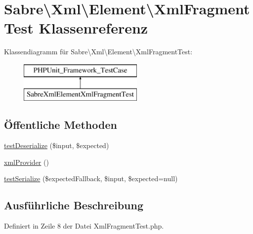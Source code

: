\hypertarget{class_sabre_1_1_xml_1_1_element_1_1_xml_fragment_test}{}\section{Sabre\textbackslash{}Xml\textbackslash{}Element\textbackslash{}Xml\+Fragment\+Test Klassenreferenz}
\label{class_sabre_1_1_xml_1_1_element_1_1_xml_fragment_test}
Klassendiagramm für Sabre\textbackslash{}Xml\textbackslash{}Element\textbackslash{}Xml\+Fragment\+Test\+:\begin{figure}[H]
\begin{center}
\leavevmode
\includegraphics[height=2.000000cm]{class_sabre_1_1_xml_1_1_element_1_1_xml_fragment_test}
\end{center}
\end{figure}
\subsection*{Öffentliche Methoden}
\begin{DoxyCompactItemize}
\item 
\mbox{\hyperlink{class_sabre_1_1_xml_1_1_element_1_1_xml_fragment_test_a6ca44021072236d4c691b8068839e6fc}{test\+Deserialize}} (\$input, \$expected)
\item 
\mbox{\hyperlink{class_sabre_1_1_xml_1_1_element_1_1_xml_fragment_test_a747d4b9957d75133458bade9db5d545b}{xml\+Provider}} ()
\item 
\mbox{\hyperlink{class_sabre_1_1_xml_1_1_element_1_1_xml_fragment_test_acaabd20001aebe2629bbb790b2d32e6f}{test\+Serialize}} (\$expected\+Fallback, \$input, \$expected=null)
\end{DoxyCompactItemize}


\subsection{Ausführliche Beschreibung}


Definiert in Zeile 8 der Datei Xml\+Fragment\+Test.\+php.



